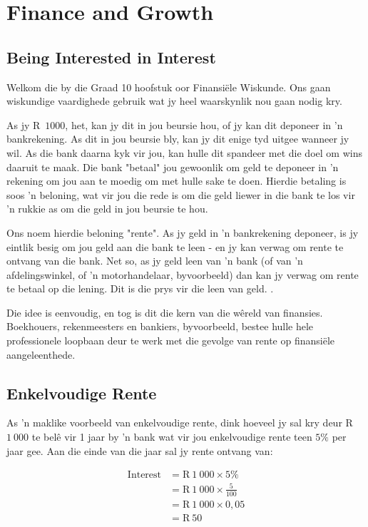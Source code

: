 \chapter{Finance and Growth}

\section{ Being Interested in Interest}

Welkom die by die Graad 10 hoofstuk oor Finansiële Wiskunde. Ons gaan wiskundige vaardighede gebruik wat
jy heel waarskynlik nou gaan nodig kry.\par

As jy R~$1 000$, het, kan jy dit in jou beursie hou, of jy kan dit deponeer in ’n bankrekening. As dit in jou beursie bly,
kan jy dit enige tyd uitgee wanneer jy wil. As die bank daarna kyk vir jou, kan hulle dit spandeer met die doel om
wins daaruit te maak. Die bank "betaal" jou gewoonlik om geld te deponeer in ’n rekening om jou aan te moedig
om met hulle sake te doen. Hierdie betaling is soos ’n beloning, wat vir jou die rede is om die geld liewer in die
bank te los vir ’n rukkie as om die geld in jou beursie te hou.\par Ons noem hierdie beloning "rente".
As jy geld in ’n bankrekening deponeer, is jy eintlik besig om jou geld aan die bank te leen - en jy kan verwag om
rente te ontvang van die bank. Net so, as jy geld leen van ’n bank (of van ’n afdelingswinkel, of ’n motorhandelaar,
byvoorbeeld) dan kan jy verwag om rente te betaal op die lening. Dit is die prys vir die leen van geld.
.\par

Die idee is eenvoudig, en tog is dit die kern van die wêreld van finansies. Boekhouers, rekenmeesters en
bankiers, byvoorbeeld, bestee hulle hele professionele loopbaan deur te werk met die gevolge van rente op
finansiële aangeleenthede.\par

\section{Enkelvoudige Rente}
  
As ’n maklike voorbeeld van enkelvoudige rente, dink hoeveel jy sal kry deur R~$1~000$ te belê vir 1 jaar by ’n bank
wat vir jou enkelvoudige rente teen $5\%$ per jaar gee. Aan die einde van die jaar sal jy rente ontvang van:\par
\begin{align*}
    \mathrm{Interest} &= \text{R}~1~000 \times 5\%\\
    &= \text{R}~1~000 \times \frac{5}{100}\\
    &= \text{R}~1~000 \times 0,05\\
    &= \text{R}~50
\end{align*}

